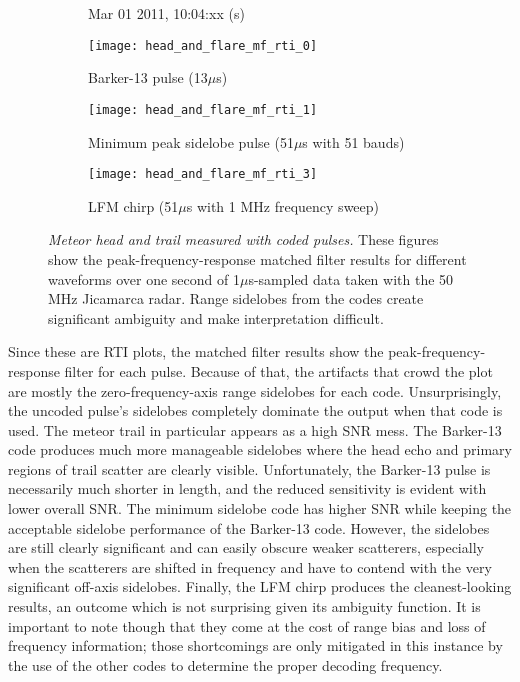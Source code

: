 \begin{figure}[tpb]
 \vspace{-1.5\baselineskip}
 \begin{subfigure}{\textwidth}
  \centering
  \textsf{\footnotesize Mar 01 2011, 10:04:xx (s)}
  
  \texttt{[image: head\_and\_flare\_mf\_rti\_0]}
  \caption{Barker-13 pulse (13$\mu$s)}
  \label{fig:meteor_barker13_mf}
 \end{subfigure}
 
 \vspace{0.5\baselineskip}
 \begin{subfigure}{\textwidth}
  \centering
  \texttt{[image: head\_and\_flare\_mf\_rti\_1]}
  \caption{Minimum peak sidelobe pulse (51$\mu$s with 51 bauds)}
  \label{fig:meteor_msl_mf}
 \end{subfigure}
 
 \vspace{0.5\baselineskip}
 \begin{subfigure}{\textwidth}
  \centering
  \texttt{[image: head\_and\_flare\_mf\_rti\_3]}
  \caption{LFM chirp (51$\mu$s with 1 MHz frequency sweep)}
  \label{fig:meteor_lfm_mf}
 \end{subfigure}
 \caption[Meteor head and trail measured with coded pulses]{\emph{Meteor head and trail measured with coded pulses.} These figures show the peak-frequency-response matched filter results for different waveforms over one second of 1$\mu$s-sampled data taken with the 50 MHz Jicamarca radar. Range sidelobes from the codes create significant ambiguity and make interpretation difficult.}
 \label{fig:meteor_msl_lfm}
\end{figure}%
Since these are RTI plots, the matched filter results show the peak-frequency-response filter for each pulse. Because of that, the artifacts that crowd the plot are mostly the zero-frequency-axis range sidelobes for each code. Unsurprisingly, the uncoded pulse's sidelobes completely dominate the output when that code is used. The meteor trail in particular appears as a high SNR mess. The Barker-13 code produces much more manageable sidelobes where the head echo and primary regions of trail scatter are clearly visible. Unfortunately, the Barker-13 pulse is necessarily much shorter in length, and the reduced sensitivity is evident with lower overall SNR. The minimum sidelobe code has higher SNR while keeping the acceptable sidelobe performance of the Barker-13 code. However, the sidelobes are still clearly significant and can easily obscure weaker scatterers, especially when the scatterers are shifted in frequency and have to contend with the very significant off-axis sidelobes. Finally, the LFM chirp produces the cleanest-looking results, an outcome which is not surprising given its ambiguity function. It is important to note though that they come at the cost of range bias and loss of frequency information; those shortcomings are only mitigated in this instance by the use of the other codes to determine the proper decoding frequency.

